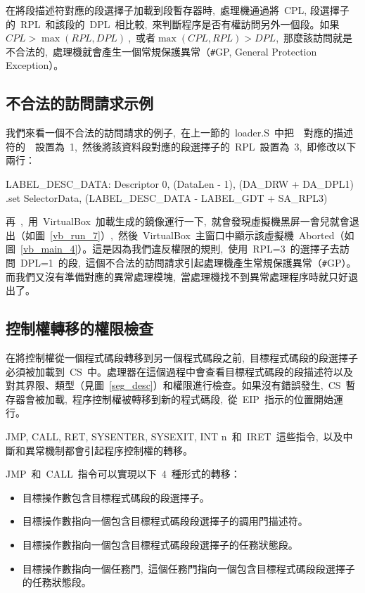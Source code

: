 在將段描述符對應的段選擇子加載到段暫存器時,~處理機通過將~CPL, 段選擇子的~RPL~和該段的~DPL~相比較,~來判斷程序是否有權訪問另外一個段。如果~$CPL>\max{(RPL, DPL)}~$,~或者$\max{(CPL, RPL)}>DPL$,~那麼該訪問就是不合法的,~處理機就會產生一個常規保護異常（\texttt{\#}GP, General Protection Exception）。

\subsection{不合法的訪問請求示例}

我們來看一個不合法的訪問請求的例子,~在上一節的~loader.S~中把~~對應的描述符的~~設置為~1,~然後將該資料段對應的段選擇子的~RPL~設置為~3,~即修改以下兩行：
\begin{Command}
LABEL_DESC_DATA:    Descriptor        0,      (DataLen - 1), (DA_DRW + DA_DPL1)
.set    SelectorData,   (LABEL_DESC_DATA   - LABEL_GDT + SA_RPL3)
\end{Command}



再~,~用~VirtualBox~加載生成的鏡像運行一下,~就會發現虛擬機黑屏一會兒就會退出（如圖~\ref{vb_run_7}）,~然後~VirtualBox~主窗口中顯示該虛擬機~Aborted（如圖~\ref{vb_main_4}）。這是因為我們違反權限的規則,~使用~RPL=3~的選擇子去訪問~DPL=1~的段,~這個不合法的訪問請求引起處理機產生常規保護異常（\texttt{\#}GP）。而我們又沒有準備對應的異常處理模塊,~當處理機找不到異常處理程序時就只好退出了。


\subsection{控制權轉移的權限檢查}

在將控制權從一個程式碼段轉移到另一個程式碼段之前,~目標程式碼段的段選擇子必須被加載到~CS~中。處理器在這個過程中會查看目標程式碼段的段描述符以及對其界限、類型（見圖~\ref{seg_desc}）和權限進行檢查。如果沒有錯誤發生,~CS~暫存器會被加載,~程序控制權被轉移到新的程式碼段,~從~EIP~指示的位置開始運行。

JMP, CALL, RET, SYSENTER, SYSEXIT, INT n~和~IRET~這些指令,~以及中斷和異常機制都會引起程序控制權的轉移。

JMP~和~CALL~指令可以實現以下~4~種形式的轉移：

\begin{itemize}
\item 目標操作數包含目標程式碼段的段選擇子。
\item 目標操作數指向一個包含目標程式碼段段選擇子的調用門描述符。
\item 目標操作數指向一個包含目標程式碼段段選擇子的任務狀態段。
\item 目標操作數指向一個任務門,~這個任務門指向一個包含目標程式碼段段選擇子的任務狀態段。
\end{itemize}

